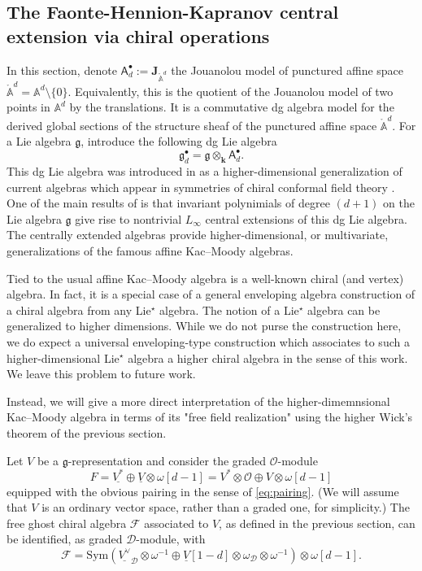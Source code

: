 \documentclass[11pt]{amsart}
\theoremstyle{definition}
\theoremstyle{remark}
\numberwithin{equation}{section}
\newcommand{\bu}{\bullet}
\begin{document}
\subsection{The Faonte-Hennion-Kapranov central extension via chiral operations}

In this section, denote $\mathsf{A}^\bu_d := \mathbf{J}_{\mathring{\mathbb{A}}^d}$ the Jouanolou model of
punctured affine space~$\mathring{\mathbb{A}}^d = \mathbb{A}^d \setminus \{0\}$.
Equivalently, this is the quotient of the Jouanolou model of two points in $\mathbb{A}^d$ by the translations.
It is a commutative dg algebra model for the derived global sections of the structure sheaf of the punctured affine
space $\mathring{\mathbb{A}}^d$.
For a Lie algebra $\mathfrak{g}$, introduce the following dg Lie algebra
$$
\mathfrak{g}^{\bullet}_d=\mathfrak{g}\otimes_{\mathbf{k}} \mathsf{A}_d^{\bullet}.
$$
This dg Lie algebra was introduced in \cite{FHK} as a higher-dimensional generalization of current algebras which
appear in symmetries of chiral conformal field theory \cite{GWkm}.
One of the main results of \cite{FHK} is that invariant polynimials of degree $(d+1)$ on the Lie algebra $\mathfrak{g}$ give
rise to nontrivial $L_\infty$ central extensions of this dg Lie algebra.
The centrally extended algebras provide higher-dimensional, or multivariate, generalizations of the famous affine Kac--Moody algebras.

Tied to the usual affine Kac--Moody algebra is a well-known chiral (and vertex) algebra.
In fact, it is a special case of a general enveloping algebra construction of a chiral algebra from any Lie$^\star$ algebra.
The notion of a Lie$^\star$ algebra can be generalized to higher dimensions.
While we do not purse the construction here, we do expect a universal enveloping-type construction which associates to
such a higher-dimensional Lie$^\star$ algebra a higher chiral algebra in the sense of this work.
We leave this problem to future work.

Instead, we will give a more direct interpretation of the higher-dimemnsional Kac--Moody algebra in terms of its "free
field realization" using the higher Wick's theorem of the previous section.

Let $V$ be a $\mathfrak{g}$-representation and consider the graded $\mathcal{O}$-module
\[
  F = \underline{V^*} \oplus \underline{V} \otimes
\omega [d-1] = V^* \otimes \mathcal{O}\oplus V \otimes \omega [d-1]
\]
equipped with the obvious pairing in the sense of \eqref{eq:pairing}.
(We will assume that $V$ is an ordinary vector space, rather than a graded one, for simplicity.)
The free ghost chiral algebra $\mathcal{F}$ associated to $V$, as defined in the previous section, can be identified,
as graded $\mathcal{D}$-module, with
\begin{equation}\label{GhostChiralV}
 \mathcal{F}=\mathrm{Sym}(\underline{V^{\vee}}_{\mathcal{D}}\otimes\omega^{-1}\oplus \underline{V} [1-d]\otimes\omega_{\mathcal{D}}\otimes\omega^{-1})\otimes\omega[d-1].   
\end{equation}
\end{document}
